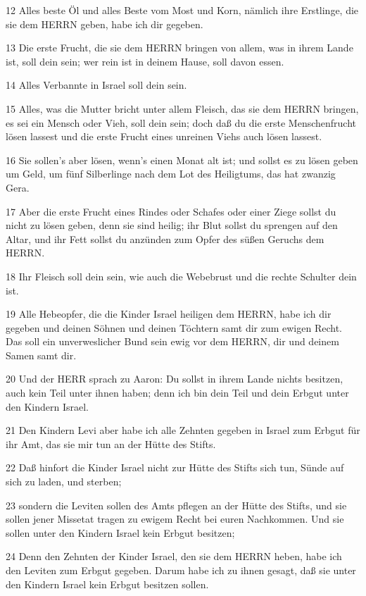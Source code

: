 \par 12 Alles beste Öl und alles Beste vom Most und Korn, nämlich ihre Erstlinge, die sie dem HERRN geben, habe ich dir gegeben.
\par 13 Die erste Frucht, die sie dem HERRN bringen von allem, was in ihrem Lande ist, soll dein sein; wer rein ist in deinem Hause, soll davon essen.
\par 14 Alles Verbannte in Israel soll dein sein.
\par 15 Alles, was die Mutter bricht unter allem Fleisch, das sie dem HERRN bringen, es sei ein Mensch oder Vieh, soll dein sein; doch daß du die erste Menschenfrucht lösen lassest und die erste Frucht eines unreinen Viehs auch lösen lassest.
\par 16 Sie sollen's aber lösen, wenn's einen Monat alt ist; und sollst es zu lösen geben um Geld, um fünf Silberlinge nach dem Lot des Heiligtums, das hat zwanzig Gera.
\par 17 Aber die erste Frucht eines Rindes oder Schafes oder einer Ziege sollst du nicht zu lösen geben, denn sie sind heilig; ihr Blut sollst du sprengen auf den Altar, und ihr Fett sollst du anzünden zum Opfer des süßen Geruchs dem HERRN.
\par 18 Ihr Fleisch soll dein sein, wie auch die Webebrust und die rechte Schulter dein ist.
\par 19 Alle Hebeopfer, die die Kinder Israel heiligen dem HERRN, habe ich dir gegeben und deinen Söhnen und deinen Töchtern samt dir zum ewigen Recht. Das soll ein unverweslicher Bund sein ewig vor dem HERRN, dir und deinem Samen samt dir.
\par 20 Und der HERR sprach zu Aaron: Du sollst in ihrem Lande nichts besitzen, auch kein Teil unter ihnen haben; denn ich bin dein Teil und dein Erbgut unter den Kindern Israel.
\par 21 Den Kindern Levi aber habe ich alle Zehnten gegeben in Israel zum Erbgut für ihr Amt, das sie mir tun an der Hütte des Stifts.
\par 22 Daß hinfort die Kinder Israel nicht zur Hütte des Stifts sich tun, Sünde auf sich zu laden, und sterben;
\par 23 sondern die Leviten sollen des Amts pflegen an der Hütte des Stifts, und sie sollen jener Missetat tragen zu ewigem Recht bei euren Nachkommen. Und sie sollen unter den Kindern Israel kein Erbgut besitzen;
\par 24 Denn den Zehnten der Kinder Israel, den sie dem HERRN heben, habe ich den Leviten zum Erbgut gegeben. Darum habe ich zu ihnen gesagt, daß sie unter den Kindern Israel kein Erbgut besitzen sollen.
